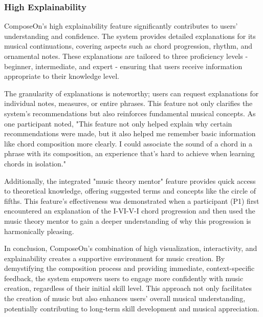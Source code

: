 \subsubsection{High Explainability}

ComposeOn's high explainability feature significantly contributes to users' understanding and confidence. The system provides detailed explanations for its musical continuations, covering aspects such as chord progression, rhythm, and ornamental notes. These explanations are tailored to three proficiency levels - beginner, intermediate, and expert - ensuring that users receive information appropriate to their knowledge level.

The granularity of explanations is noteworthy; users can request explanations for individual notes, measures, or entire phrases. This feature not only clarifies the system's recommendations but also reinforces fundamental musical concepts. As one participant noted, "This feature not only helped explain why certain recommendations were made, but it also helped me remember basic information like chord composition more clearly. I could associate the sound of a chord in a phrase with its composition, an experience that's hard to achieve when learning chords in isolation."

Additionally, the integrated "music theory mentor" feature provides quick access to theoretical knowledge, offering suggested terms and concepts like the circle of fifths. This feature's effectiveness was demonstrated when a participant (P1) first encountered an explanation of the I-VI-V-I chord progression and then used the music theory mentor to gain a deeper understanding of why this progression is harmonically pleasing.

In conclusion, ComposeOn's combination of high visualization, interactivity, and explainability creates a supportive environment for music creation. By demystifying the composition process and providing immediate, context-specific feedback, the system empowers users to engage more confidently with music creation, regardless of their initial skill level. This approach not only facilitates the creation of music but also enhances users' overall musical understanding, potentially contributing to long-term skill development and musical appreciation.